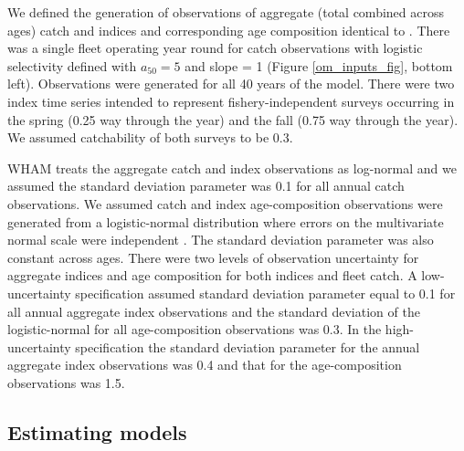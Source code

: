 \documentclass[
  12pt,
]{article}
\begin{document}
We defined the generation of observations of aggregate (total combined across ages) catch and indices and corresponding age composition identical to \citet{milleretal_inreview1}. There was a single fleet operating year round for catch observations with logistic selectivity defined with \(a_{50} = 5\) and slope = 1 (Figure \ref{om_inputs_fig}, bottom left). Observations were generated for all 40 years of the model. There were two index time series intended to represent fishery-independent surveys occurring in the spring (0.25 way through the year) and the fall (0.75 way through the year). We assumed catchability of both surveys to be 0.3.

WHAM treats the aggregate catch and index observations as log-normal and we assumed the standard deviation parameter was 0.1 for all annual catch observations. We assumed catch and index age-composition observations were generated from a logistic-normal distribution where errors on the multivariate normal scale were independent \citep{aitchisonshen80, stockmiller21, trijouletetal23}. The standard deviation parameter was also constant across ages. There were two levels of observation uncertainty for aggregate indices and age composition for both indices and fleet catch. A low-uncertainty specification assumed standard deviation parameter equal to 0.1 for all annual aggregate index observations and the standard deviation of the logistic-normal for all age-composition observations was 0.3. In the high-uncertainty specification the standard deviation parameter for the annual aggregate index observations was 0.4 and that for the age-composition observations was 1.5.

\subsection*{Estimating models}\label{estimating-models}
\end{document}
